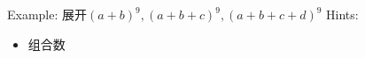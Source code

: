 \clearpage
Example: 展开$(a+b)^9, (a+b+c)^9, (a+b+c+d)^9$ 
\clearpage
Hints:
\begin{itemize}
\item 组合数 
\end{itemize}


